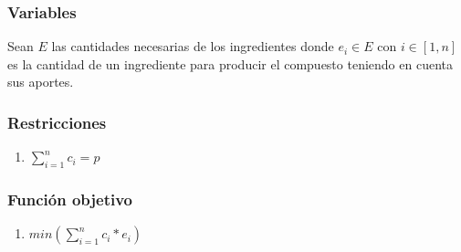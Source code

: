 \documentclass{article}
\begin{document}
\subsubsection{Variables}
Sean $E$ las cantidades necesarias de los ingredientes donde $e_i \in E$ con $i \in [1,n]$ es la cantidad de un ingrediente para producir el compuesto teniendo en cuenta sus aportes.\\

\subsubsection{Restricciones}
\begin{enumerate}
    \item $\sum_{i=1}^n c_i= p$
\end{enumerate}

\subsubsection{Función objetivo}
\begin{enumerate}
    \item $min(\sum_{i=1}^n c_i*e_i)$
\end{enumerate}
\end{document}
